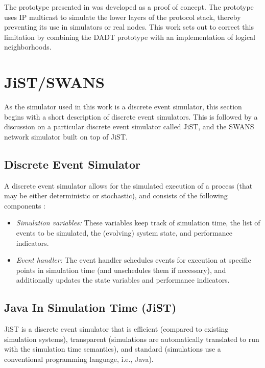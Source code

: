 The prototype presented in \cite{migliavacca_DADT:2006} was developed as a proof of 
concept. The prototype uses IP multicast to simulate the lower layers of the 
protocol stack, thereby preventing its use in simulators or real nodes. This 
work sets out to correct this limitation by combining the DADT prototype with 
an implementation of logical neighborhoods. %

\section {JiST/SWANS}

As the simulator used in this work is a discrete event simulator, this section 
begins with a short description of discrete event simulators. 
This is followed by a discussion on a particular discrete event simulator
called JiST, and the SWANS network simulator built on top of JiST.

\subsection{Discrete Event Simulator}

A discrete event simulator allows for the simulated execution of a process (that
may be either deterministic or stochastic), and consists of the following
components \cite{Shankar_DiscreteEventSim}:

\begin{itemize}
  \item \emph{Simulation variables:} These variables keep track of simulation 
  time, the list of events to be simulated, the (evolving) system state, and 
  performance indicators.
  \item \emph{Event handler:} The event handler schedules events for execution 
  at specific points in simulation time (and unschedules them if necessary), 
  and additionally updates the state variables and performance indicators.
\end{itemize}
 
\subsection{Java In Simulation Time (JiST)} \label{subsec:jist}

JiST \cite{barr_JIST:2005} is a discrete event simulator that is 
efficient (compared to existing simulation systems), 
transparent (simulations are automatically translated to run with the 
simulation time semantics), and standard (simulations use a
conventional programming language, i.e., Java).

